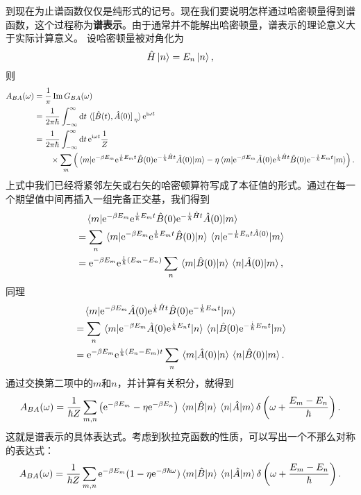\documentclass[hyperref, UTF8, a4paper]{ctexart}
\newcommand*{\ii}{\mathrm{i}}
\newcommand*{\ee}{\mathrm{e}}
\begin{document}
到现在为止谱函数仅仅是纯形式的记号。现在我们要说明怎样通过哈密顿量得到谱函数，这个过程称为\textbf{谱表示}。由于通常并不能解出哈密顿量，谱表示的理论意义大于实际计算意义。
设哈密顿量被对角化为
\[
    \hat{H} \ket{n} = E_n \ket{n},
\]
则
\[
    \begin{aligned}
        A_{BA} (\omega) &= \frac{1}{\pi} \Im G_{BA}(\omega) \\
        &= \frac{1}{2 \pi \hbar} \int_{-\infty}^\infty \dd{t} \expval*{\comm*{\hat{B}(t)}{\hat{A}(0)}_\eta} \ee^{\ii \omega t} \\
        &= \frac{1}{2 \pi \hbar} \int_{-\infty}^\infty \dd{t} \ee^{\ii \omega t} \frac{1}{Z} \\
        & \quad \quad \times \sum_m \left( \mel{m}{\ee^{-\beta E_m} \ee^{\frac{\ii}{\hbar} E_m t} \hat{B}(0) \ee^{- \frac{\ii}{\hbar} \hat{H} t} \hat{A}(0) }{m} - \eta \mel{m}{\ee^{-\beta E_m} \hat{A}(0) \ee^{\frac{\ii}{\hbar} \hat{H} t} \hat{B}(0) \ee^{- \frac{\ii}{\hbar} E_m t} }{m} \right).
    \end{aligned}
\]
上式中我们已经将紧邻左矢或右矢的哈密顿算符写成了本征值的形式。通过在每一个期望值中间再插入一组完备正交基，我们得到
\[
    \begin{aligned}
        &\quad \mel{m}{\ee^{-\beta E_m} \ee^{\frac{\ii}{\hbar} E_m t} \hat{B}(0) \ee^{- \frac{\ii}{\hbar} \hat{H} t} \hat{A}(0) }{m} \\
        &= \sum_n \mel{m}{\ee^{-\beta E_m} \ee^{\frac{\ii}{\hbar} E_m t} \hat{B}(0)}{n} \mel{n}{\ee^{- \frac{\ii}{\hbar} E_n t \hat{A}(0) }}{m} \\
        &= \ee^{- \beta E_m} \ee^{\frac{\ii}{\hbar} (E_m - E_n)} \sum_n \mel{m}{\hat{B}(0)}{n} \mel{n}{\hat{A}(0)}{m},
    \end{aligned}
\]
同理
\[
    \begin{aligned}
        &\quad \mel{m}{\ee^{-\beta E_m} \hat{A}(0) \ee^{\frac{\ii}{\hbar} \hat{H} t} \hat{B}(0) \ee^{- \frac{\ii}{\hbar} E_m t} }{m} \\
        &= \sum_n \mel{m}{\ee^{-\beta E_m} \hat{A}(0) \ee^{\frac{\ii}{\hbar} E_n t}}{n} \mel{n}{\hat{B}(0) \ee^{- \frac{\ii}{\hbar} E_m t}}{m} \\
        &= \ee^{-\beta E_m} \ee^{\frac{\ii}{\hbar} (E_n - E_m) t} \sum_n \mel{m}{\hat{A}(0)}{n} \mel{n}{\hat{B}(0)}{m}.
    \end{aligned}
\]
通过交换第二项中的$m$和$n$，并计算有关积分，就得到
\begin{equation}
    A_{BA}(\omega) = \frac{1}{\hbar Z} \sum_{m,n} \left( \ee^{-\beta E_m} - \eta \ee^{-\beta E_n} \right) \mel{m}{\hat{B}}{n} \mel{n}{\hat{A}}{m} \delta\left( \omega + \frac{E_m - E_n}{\hbar} \right).
\end{equation}
这就是谱表示的具体表达式。考虑到狄拉克函数的性质，可以写出一个不那么对称的表达式：
\begin{equation}
    A_{BA}(\omega) = \frac{1}{\hbar Z} \sum_{m,n} \ee^{-\beta E_m} (1 - \eta \ee^{- \beta \hbar \omega}) \mel{m}{\hat{B}}{n} \mel{n}{\hat{A}}{m} \delta\left( \omega + \frac{E_m - E_n}{\hbar} \right). 
\end{equation}
\end{document}
